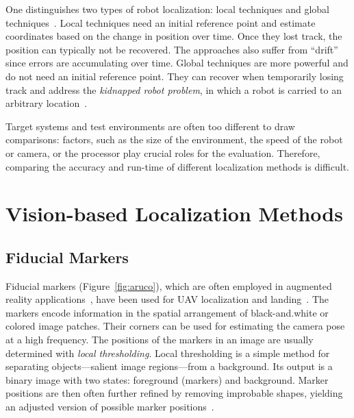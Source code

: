 \documentclass[11pt]{report}
\begin{document}
One distinguishes two types of robot localization: local techniques
and global techniques~\cite{fox1999monte}. Local techniques need an
initial reference point and estimate coordinates based on the change
in position over time. Once they lost track, the position can
typically not be recovered. The approaches also suffer from ``drift''
since errors are accumulating over time. Global techniques are more
powerful and do not need an initial reference point. They can recover
when temporarily losing track and address the \emph{kidnapped robot
  problem}, in which a robot is carried to an arbitrary
location~\cite{engelson1992error}.

Target systems and test environments are often too different to draw
comparisons: factors, such as the size of the environment, the speed
of the robot or camera, or the processor play crucial roles for the
evaluation. Therefore, comparing the accuracy and run-time of
different localization methods is difficult.


\section{Vision-based Localization Methods}

\subsection{Fiducial Markers}
\label{sec:fiducialmarkers}

Fiducial markers (Figure~\ref{fig:aruco}), which are often employed in
augmented reality
applications~\cite{kato1999marker,garrido2014automatic}, have been
used for UAV localization and
landing~\cite{eberli2011vision,bebop2015}. The markers encode
information in the spatial arrangement of black-and.white or colored
image patches. Their corners can be used for estimating the camera
pose at a high frequency. The positions of the markers in an image are
usually determined with \emph{local thresholding}. Local thresholding
is a simple method for separating objects---salient image
regions---from a background. Its output is a binary image with two
states: foreground (markers) and background. Marker positions are then
often further refined by removing improbable shapes, yielding an
adjusted version of possible marker positions~\cite{aruco2014}.
\end{document}
